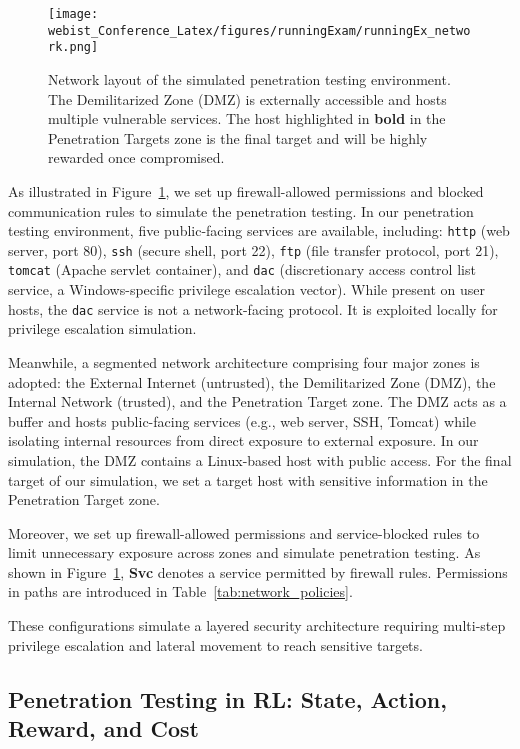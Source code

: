 \begin{figure}[ht]
    \centering
    \texttt{[image: webist\_Conference\_Latex/figures/runningExam/runningEx\_network.png]}
    \caption{Network layout of the simulated penetration testing environment. The Demilitarized Zone (DMZ) is externally accessible and hosts multiple vulnerable services. The host highlighted in \textbf{bold} in the Penetration Targets zone is the final target and will be highly rewarded once compromised. 
    }
    \label{fig:networkConfig}
\end{figure}


As illustrated in Figure~\ref{fig:networkConfig}, we set up firewall-allowed permissions and blocked communication rules to simulate the penetration testing. In our penetration testing environment, five public-facing services are available, including: \texttt{http} (web server, port 80), \texttt{ssh} (secure shell, port 22), \texttt{ftp} (file transfer protocol, port 21), \texttt{tomcat} (Apache servlet container), and \texttt{dac} (discretionary access control list service, a Windows-specific privilege escalation vector). While present on user hosts, the \texttt{dac} service is not a network-facing protocol. It is exploited locally for privilege escalation simulation. 

Meanwhile, a segmented network architecture comprising four major zones is adopted: the External Internet (untrusted), the Demilitarized Zone (DMZ), the Internal Network (trusted), and the Penetration Target zone. The DMZ acts as a buffer and hosts public-facing services (e.g., web server, SSH, Tomcat) while isolating internal resources from direct exposure to external exposure. In our simulation, the DMZ contains a Linux-based host with public access. For the final target of our simulation, we set a target host with sensitive information in the Penetration Target zone.

Moreover, we set up firewall-allowed permissions and service-blocked rules to limit unnecessary exposure across zones and simulate penetration testing. As shown in Figure~\ref{fig:networkConfig}, \textbf{Svc} denotes a service permitted by firewall rules. Permissions in paths are introduced in Table~\ref{tab:network_policies}.

These configurations simulate a layered security architecture requiring multi-step privilege escalation and lateral movement to reach sensitive targets.


\subsection{Penetration Testing in RL: State, Action, Reward, and Cost}

